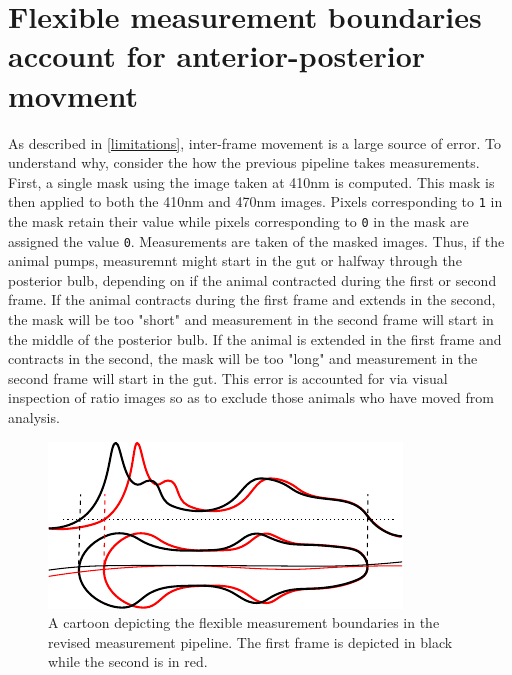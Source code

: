 \section{Flexible measurement boundaries account for anterior-posterior movment} \label{channelSegmentation}

As described in \ref{limitations}, inter-frame movement is a large source of error. To understand why, consider the how the previous pipeline takes measurements. First, a single mask using the image taken at 410nm is computed. This mask is then applied to both the 410nm and 470nm images. Pixels corresponding to \texttt{1} in the mask retain their value while pixels corresponding to \texttt{0} in the mask are assigned the value \texttt{0}. Measurements are taken of the masked images. Thus, if the animal pumps, measuremnt might start in the gut or halfway through the posterior bulb, depending on if the animal contracted during the first or second frame. If the animal contracts during the first frame and extends in the second, the mask will be too "short" and measurement in the second frame will start in the middle of the posterior bulb. If the animal is extended in the first frame and contracts in the second, the mask will be too "long" and measurement in the second frame will start in the gut. This error is accounted for via visual inspection of ratio images so as to exclude those animals who have moved from analysis.

\begin{figure}[ht]
    \centering
    \includegraphics[scale=1.20]{Figures/rendered_files/new_boundaries_cartoon}
    \decoRule
    \caption[Flexible measurement boundaries]{A cartoon depicting the flexible measurement boundaries in the revised measurement pipeline. The first frame is depicted in black while the second is in red.}
    \label{fig:NewBoundariesCartoon}
\end{figure}

